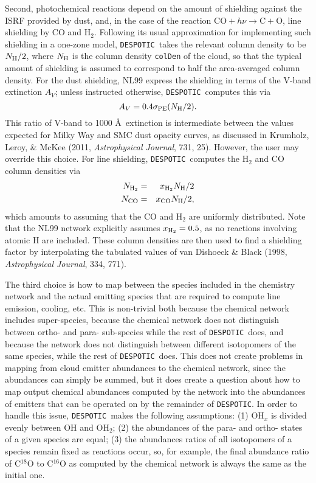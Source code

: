 \documentclass[12pt]{article}
\newcommand{\despotic}{\texttt{DESPOTIC}}
\begin{document}
Second, photochemical reactions depend on the amount of shielding against the ISRF provided by dust, and, in the case of the reaction $\mbox{CO} + h\nu \rightarrow \mbox{C} + \mbox{O}$, line shielding by CO and H$_2$. Following its usual approximation for implementing such shielding in a one-zone model, \despotic\ takes the relevant column density to be $N_{\rm H}/2$, where $N_{\rm H}$ is the column density \verb=colDen= of the cloud, so that the typical amount of shielding is assumed to correspond to half the area-averaged column density. For the dust shielding, NL99 express the shielding in terms of the V-band extinction $A_V$; unless instructed otherwise, \despotic\ computes this via
\begin{displaymath}
A_V = 0.4 \sigma_{\rm PE} (N_{\rm H}/2).
\end{displaymath}
This ratio of V-band to 1000 \AA\ extinction is intermediate between the values expected for Milky Way and SMC dust opacity curves, as discussed in Krumholz, Leroy, \& McKee (2011, \textit{Astrophysical Journal}, 731, 25). However, the user may override this choice. For line shielding, \despotic\ computes the H$_2$ and CO column densities via
\begin{eqnarray*}
N_{\rm H_2} & = & x_{\rm H_2} N_{\rm H}/2 \\
N_{\rm CO} & = & x_{\rm CO} N_{\rm H}/2,
\end{eqnarray*}
which amounts to assuming that the CO and H$_2$ are uniformly distributed. Note that the NL99 network explicitly assumes $x_{\rm H_2} = 0.5$, as no reactions involving atomic H are included. These column densities are then used to find a shielding factor by interpolating the tabulated values of van Dishoeck \& Black (1998, \textit{Astrophysical Journal}, 334, 771).

The third choice is how to map between the species included in the chemistry network and the actual emitting species that are required to compute line emission, cooling, etc. This is non-trivial both because the chemical network includes super-species, because the chemical network does not distinguish between ortho- and para- sub-species while the rest of \despotic\ does, and because the network does not distinguish between different isotopomers of the same species, while the rest of \despotic\ does. This does not create problems in mapping from cloud emitter abundances to the chemical network, since the abundances can simply be summed, but it does create a question about how to map output chemical abundances computed by the network into the abundances of emitters that can be operated on by the remainder of \despotic. In order to handle this issue, \despotic\ makes the following assumptions: (1) OH$_x$ is divided evenly between OH and OH$_2$; (2) the abundances of the para- and ortho- states of a given species are equal; (3) the abundances ratios of all isotopomers of a species remain fixed as reactions occur, so, for example, the final abundance ratio of C$^{18}$O to C$^{16}$O as computed by the chemical network is always the same as the initial one.
\end{document}
